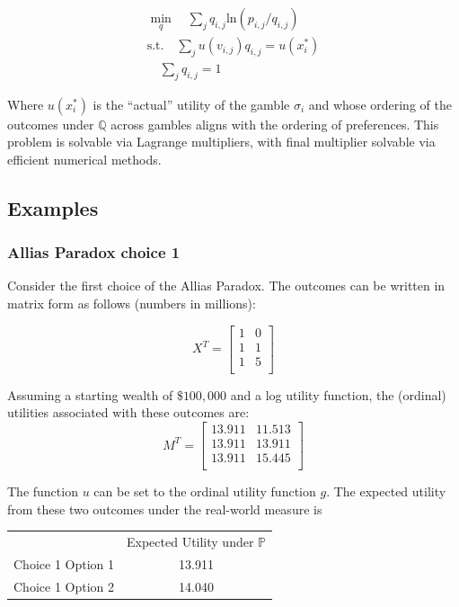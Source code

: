 \documentclass{article}
\begin{document}
\begin{equation}
\begin{aligned}
\min_q \quad \sum_j q_{i, j}\mathrm{ln}\left( p_{i, j}/q_{i, j} \right) \\
\textrm{s.t.}\quad \sum_j u(v_{i, j}) q_{i, j} = u(x^*_i)\\
\quad \sum_j q_{i,j} = 1
\end{aligned}
\end{equation}

Where \(u(x^*_i)\) is the ``actual'' utility of the gamble \(\sigma_i\) and whose ordering of the outcomes under \(\mathbb{Q}\) across gambles aligns with the ordering of preferences. This problem is solvable via Lagrange multipliers, with final multiplier solvable via efficient numerical methods.

\subsection{Examples}

\subsubsection{Allias Paradox choice 1}
Consider the first choice of the Allias Paradox.  The outcomes can be written in matrix form as follows (numbers in millions):

\[X^T=\begin{bmatrix}
	1 & 0  \\
	1 & 1  \\
	1 & 5  \\
\end{bmatrix}\]

Assuming a starting wealth of \(\$100,000\) and a log utility function, the (ordinal) utilities associated with these outcomes are:
\[M^T=\begin{bmatrix}
	13.911 & 11.513  \\
	13.911 & 13.911  \\
	13.911 & 15.445  \\
\end{bmatrix}\]

The function \(u\) can be set to the ordinal utility function \(g\).  The expected utility from these two outcomes under the real-world measure is

\begin{center}
	\begin{tabular}{c c}
		& Expected Utility under \(\mathbb{P}\) \\
		Choice 1 Option 1 & 13.911 \\
		Choice 1 Option 2 & 14.040 \\
	\end{tabular}
\end{center}
\end{document}
